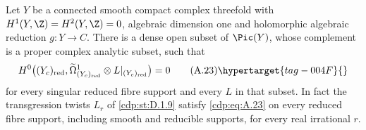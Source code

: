 \begin{proposition}\hypertarget{tag-01AY}{}\label{cdp:st:A.4.9}


Let $Y$ be a connected smooth compact complex threefold with $H^1(Y,\Z)=H^2(Y,\Z)=0$, algebraic dimension one and holomorphic algebraic reduction $g:Y\to C$. There is a dense open subset of $\Pic(Y)$, whose complement is a proper complex analytic subset, such that
\[
 H^0\bigl((Y_c)_{\rm red},
       \widetilde\Omega^1_{(Y_c)_{\rm red}}\otimes L|_{(Y_c)_{\rm red}}\bigr)=0
 \tag{A.23}\hypertarget{tag-004F}{}\label{cdp:eq:A.23}
\]
for every singular reduced fibre support and every $L$ in that subset. In fact the transgression twists $L_r$ of \ref{cdp:st:D.1.9} satisfy \eqref{cdp:eq:A.23} on every reduced fibre support, including smooth and reducible supports, for every real irrational $r$.
\end{proposition}
